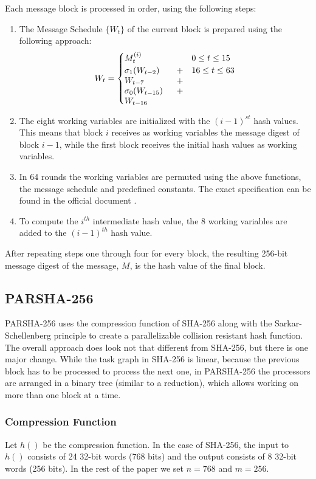 \documentclass[letterpaper]{article}
\begin{document}
Each message block is processed in order, using the following steps:
\begin{enumerate}
\item The Message Schedule $\{ W_t \}$ of the current block is prepared using the following approach:\\
$$W_t = \begin{cases}
M_t^{(i)} & 0 \leq t \leq 15 \\
 \parbox[t]{.2\textwidth}{$\sigma_1(W_{t-2})+ W_{t-7} + \sigma_0(W_{t-15})+W_{t-16}$} & 16 \leq t \leq 63
\end{cases}$$

\item The eight  working variables are initialized with the  $(i-1)^{st}$ hash values. This means that block $i$ receives as working variables the message digest of block $i-1$, while the first block receives the initial hash values as working variables. 

\item In 64 rounds the working variables are permuted using the above functions, the message schedule and predefined constants. The exact specification can be found in the official document \cite{sha}. 

\item To compute the $i^{th}$ intermediate hash value, the 8 working variables are added to the $(i-1)^{th}$ hash value.


\end{enumerate}

After repeating steps one through four  for every block, the resulting 256-bit message digest of the message, $M$, is the hash value of the final block.

\subsection{PARSHA-256 \cite{parsha256}}
PARSHA-256 uses the compression function of SHA-256 along with the Sarkar-Schellenberg \cite{sarkar} principle to create a parallelizable collision resistant hash function. The overall approach does look not that different from SHA-256, but there is one major change. While the task graph in SHA-256 is linear, because the previous block has to be processed to process the next one, in PARSHA-256 the processors are arranged in a binary tree (similar to a reduction), which allows working on more than one block at a time. 

\subsubsection{Compression Function}
Let $h()$ be the compression function. In the case of SHA-256, the input to $h()$ consists of 24 32-bit words (768 bits) and the output consists of 8 32-bit words (256 bits). In the rest of the paper we set $n = 768$ and $m = 256$.
\end{document}
